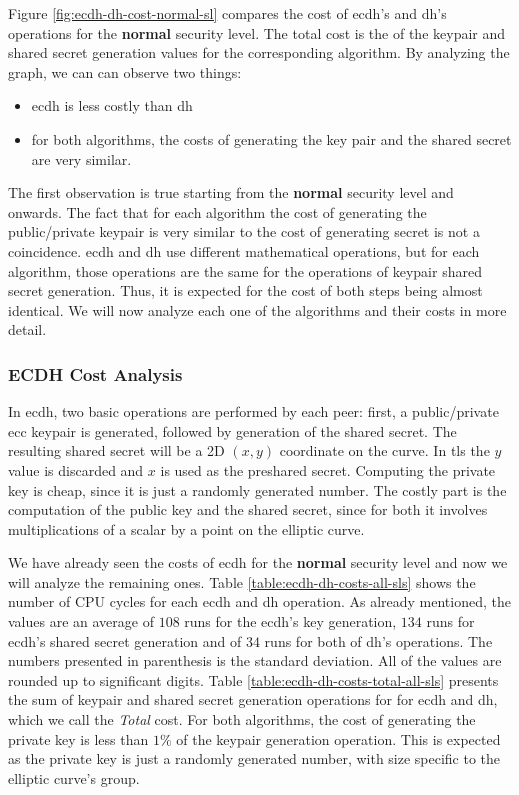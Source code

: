 Figure \ref{fig:ecdh-dh-cost-normal-sl} compares the cost of \gls{ecdh}'s and \gls{dh}'s operations for the \textbf{normal} security level.
The total cost is the of the keypair and shared secret generation values for the corresponding algorithm. By analyzing the graph, we can can
observe two things:

\begin{itemize}
  \item \gls{ecdh} is less costly than \gls{dh}
  \item for both algorithms, the costs of generating the key pair and the shared secret are very similar.
\end{itemize}

The first observation is true starting from the \textbf{normal} security level and onwards.
The fact that for each algorithm the cost of generating the public/private keypair is very similar to the cost of generating secret is not a coincidence.
\gls{ecdh} and \gls{dh} use different mathematical operations, but for each algorithm, those operations are the same for the operations of keypair
shared secret generation. Thus, it is expected for the cost of both steps being almost identical. We will now analyze each one of the algorithms and
their costs in more detail.

\subsubsection{ECDH Cost Analysis}

In \gls{ecdh}, two basic operations are performed by each peer: first, a public/private \gls{ecc} keypair is generated, followed by generation of
the shared secret. The resulting shared secret will be a 2D $(x,y)$ coordinate on the curve. In \gls{tls} the $y$ value is discarded and $x$ is
used as the preshared secret. Computing the private key is cheap, since it is just a randomly generated number. The costly part is the computation of
the public key and the shared secret, since for both it involves multiplications of a scalar by a point on the elliptic curve.

We have already seen the costs of \gls{ecdh} for the \textbf{normal} security level and now we will analyze the remaining ones. Table
\ref{table:ecdh-dh-costs-all-sls} shows the number of CPU cycles for each \gls{ecdh} and \gls{dh} operation. As already mentioned, the values are
an average of $108$ runs for the \gls{ecdh}'s key generation, $134$ runs for \gls{ecdh}'s shared secret generation and of $34$ runs for both of \gls{dh}'s
operations. The numbers presented in parenthesis is the standard deviation. All of the values are rounded up to significant digits.
Table \ref{table:ecdh-dh-costs-total-all-sls} presents the sum of keypair and shared secret generation operations for for \gls{ecdh} and \gls{dh},
which we call the \textit{Total} cost. For both algorithms, the cost of generating the private key is less than $1\%$ of the keypair generation operation.
This is expected as the private key is just a randomly generated number, with size specific to the elliptic curve's group.

